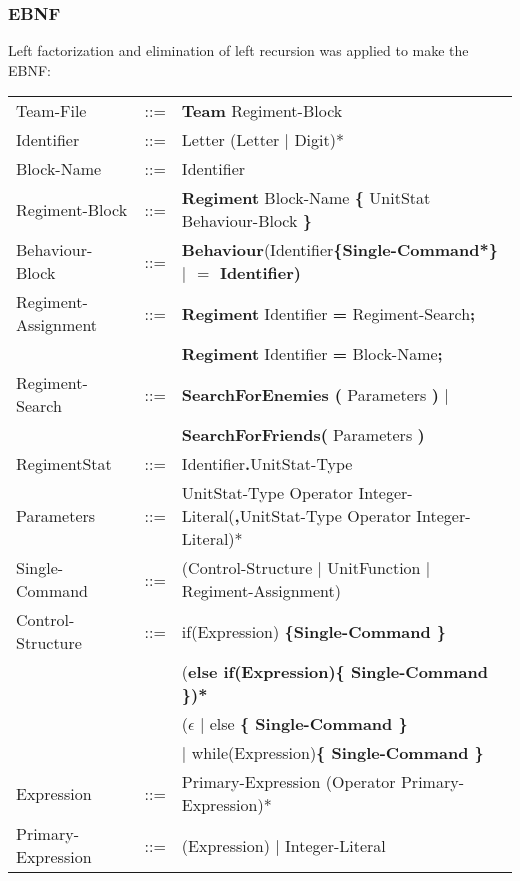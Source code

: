 	\subsubsection{EBNF}
		Left factorization and elimination of left recursion was applied to make the EBNF: \\
		\begin{center}
			\begin{longtable}{ l l l }
				\endfirsthead
				\endhead
	Team-File		   &	::=	 & {\bf Team} Regiment-Block \\
	Identifier 		   &    ::=  & Letter (Letter $\mid$ Digit)*\\
	Block-Name		   &	::=  & Identifier							\\
	Regiment-Block     &	::=	 & {\bf Regiment} Block-Name {\bf \{ } UnitStat Behaviour-Block \bf{\} }\\
	Behaviour-Block	   &	::=	 & {\bf Behaviour}(Identifier\bf{\{}Single-Command*\bf{\}} $\mid$ {\bf $=$} Identifier)\\
	Regiment-Assignment&    ::=  &{\bf Regiment} Identifier {\bf =} Regiment-Search{\bf ;}\\
					   &         &{\bf Regiment} Identifier {\bf =} Block-Name{\bf ;}\\
	Regiment-Search	   &	::=	 &{\bf SearchForEnemies (} Parameters {\bf )} $\mid$\\
					   &		 & {\bf SearchForFriends(} Parameters {\bf )}	 \\
	RegimentStat 	   &	::=  & Identifier{\bf.}UnitStat-Type \\
	Parameters		   &	::=	 & UnitStat-Type Operator Integer-Literal({\bf ,}UnitStat-Type Operator Integer-Literal)*\\
	Single-Command     &	::=  & (Control-Structure $\mid$ UnitFunction $\mid$ Regiment-Assignment)\\		
	Control-Structure  &  	::=  & if(Expression) \bf{\{}Single-Command \bf{\}}\\
					   &  	     & (\bf{else if(}Expression\bf{)\{ }Single-Command\bf{ \}})* \\
					   &		 & ($\epsilon$ $\mid$ else \bf{\{ }Single-Command \bf{\} }\\					   
					   &   		 & $\mid$ while(Expression)\bf{\{ } Single-Command \bf{\}}\\
	Expression 		   &	::=	 & Primary-Expression (Operator Primary-Expression)*\\
	Primary-Expression &	::=  & (Expression) $\mid$ Integer-Literal \\

\end{longtable}
\end{center}
